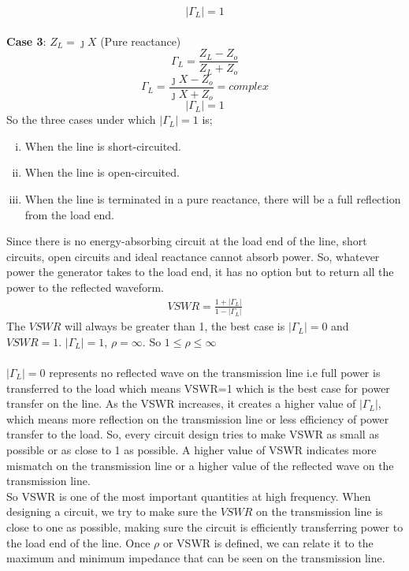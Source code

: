 \begin{equation*}
|\Gamma_L| = 1
\end{equation*}\\
\textbf{Case 3}: $Z_L = \jmath X$ (Pure reactance)
\begin{equation*}
\Gamma_L= \frac{Z_L -Z_o}{Z_L + Z_o}
\end{equation*}
\begin{equation*}
\Gamma_L = \frac{\jmath X - Z_o}{\jmath X + Z_o} = complex
\end{equation*}
\begin{equation*}
|\Gamma_L| = 1
\end{equation*}
So the three cases under which $|\Gamma_L|=1$ is;
\begin{enumerate}[(i)]
\item When the line is short-circuited.
\item When the line is open-circuited.
\item When the line is terminated in a pure reactance, there will be a full reflection from the load end.
\end{enumerate}
Since there is no energy-absorbing circuit at the load end of the line, short circuits, open circuits and ideal reactance cannot absorb power. So, whatever power the generator takes to the load end, it has no option but to return all the power to the reflected waveform.
\begin{align*}
VSWR  = \frac{1+|\Gamma_L|}{1-|\Gamma_L|}
\end{align*}
The $VSWR$ will always be greater than 1, the best case is $|\Gamma_L|=0$ and $VSWR=1$.
$|\Gamma_L|=1$, $\rho= \infty$. So $1\leq\rho\leq\infty$\\\\
$|\Gamma_L|=0$ represents no reflected wave on the transmission line i.e full power is transferred to the load which means VSWR=1 which is the best case for power transfer on the line. As the VSWR increases, it creates a higher value of $|\Gamma_L|$, which means more reflection on the transmission line or less efficiency of power transfer to the load. So, every circuit design tries to make VSWR as small as possible or as close to 1 as possible. A higher value of VSWR indicates more mismatch on the transmission line or a higher value of the reflected wave on the transmission line.\\
So VSWR is one of the most important quantities at high frequency. When designing a circuit, we try to make sure the $VSWR$ on the transmission line is close to one as possible, making sure the circuit is efficiently transferring power to the load end of the line. Once $\rho$ or VSWR is defined, we can relate it to the maximum and minimum impedance that can be seen on the transmission line.\\
